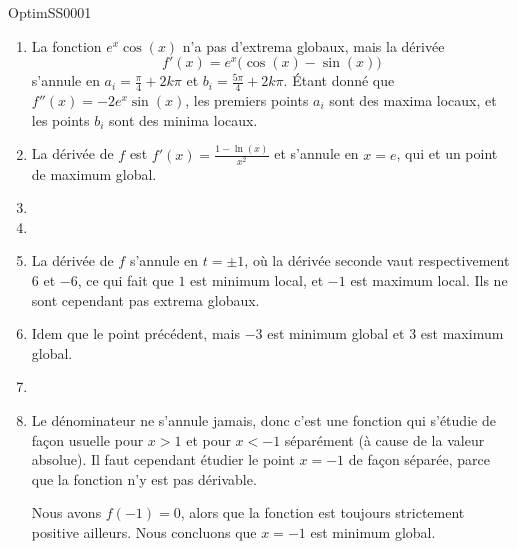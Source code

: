 
\begin{corrige}{OptimSS0001}

\begin{enumerate}

\item
La fonction $e^x\cos(x)$ n'a pas d'extrema globaux, mais la dérivée
\begin{equation}
	f'(x)=e^x\big( \cos(x)-\sin(x) \big)
\end{equation}
s'annule en $a_i=\frac{ \pi }{ 4 }+2k\pi$ et $b_i=\frac{ 5\pi }{ 4 }+2k\pi$. Étant donné que $f''(x)=-2e^x\sin(x)$, les premiers points $a_i$ sont des maxima locaux, et les points $b_i$ sont des minima locaux.

\item
La dérivée de $f$ est $f'(x)=\frac{ 1-\ln(x) }{ x^2 }$ et s'annule en $x=e$, qui et un point de maximum global.
\item
\item
\item
La dérivée de $f$ s'annule en $t=\pm 1$, où la dérivée seconde vaut respectivement $6$ et $-6$, ce qui fait que $1$ est minimum local, et $-1$ est maximum local. Ils ne sont cependant pas extrema globaux.

\item
Idem que le point précédent, mais $-3$ est minimum global et $3$ est maximum global.

\item
\item
Le dénominateur ne s'annule jamais, donc c'est une fonction qui s'étudie de façon usuelle pour $x>1$ et pour $x<-1$ séparément (à cause de la valeur absolue). Il faut cependant étudier le point $x=-1$ de façon séparée, parce que la fonction n'y est pas dérivable.

Nous avons $f(-1)=0$, alors que la fonction est toujours strictement positive ailleurs. Nous concluons que $x=-1$ est minimum global.
\end{enumerate}

\end{corrige}
